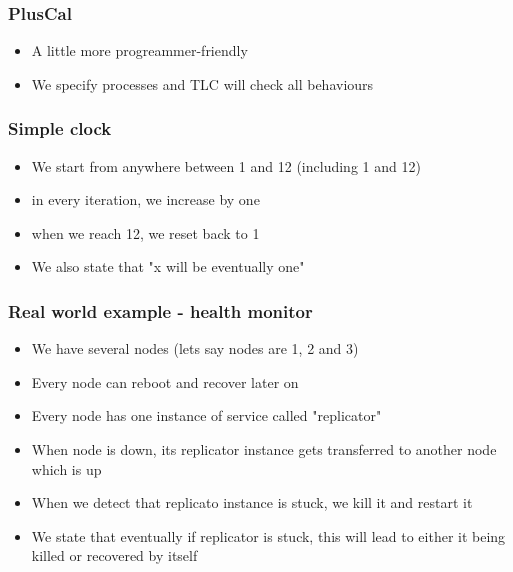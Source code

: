 \documentclass{beamer}
\begin{document}
\begin{frame}
    \frametitle{PlusCal}
    \begin{itemize}
        \item A little more progreammer-friendly 
        \item We specify processes and TLC will check all behaviours
    \end{itemize}
\end{frame}

\begin{frame}[fragile]
    \frametitle{Simple clock}
    \begin{itemize}
        \item We start from anywhere between 1 and 12 (including 1 and 12)
        \item in every iteration, we increase by one 
        \item when we reach 12, we reset back to 1 
        \item We also state that "x will be eventually one"
    \end{itemize}
\end{frame}



\begin{frame}[fragile]
    \frametitle{Real world example - health monitor}
    \begin{itemize}
        \item We have several nodes (lets say nodes are 1, 2 and 3)
        \item Every node can reboot and recover later on 
        \item Every node has one instance of service called "replicator"
        \item When node is down, its replicator instance gets transferred to another node which is up 
        \item When we detect that replicato instance is stuck, we kill it and restart it 
        \item We state that eventually if replicator is stuck, this will lead to either it being killed or recovered by itself
    \end{itemize}
\end{frame}
\end{document}
